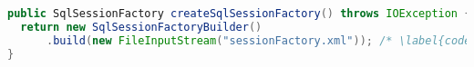 
\begin{lstlisting}[language=Java, caption={Example of loading data using XML Configuration}, label={code:mybatis:sessionFactory:xml}]
public SqlSessionFactory createSqlSessionFactory() throws IOException {
  return new SqlSessionFactoryBuilder()
      .build(new FileInputStream("sessionFactory.xml")); /* \label{code:mybatis:sessionFactory:xml:file} */
}
\end{lstlisting}
